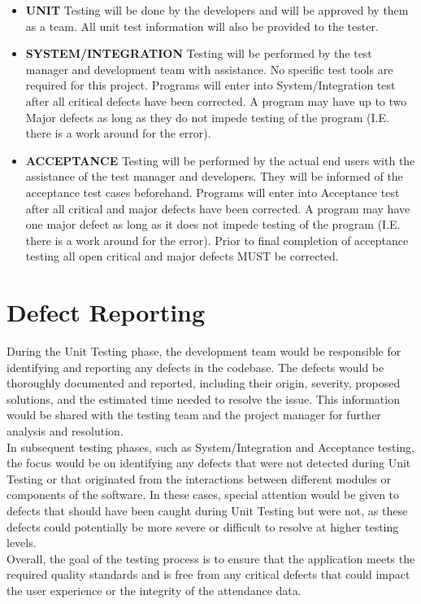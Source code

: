 \documentclass{scrreprt}
\begin{document}
\begin{itemize}
    \item \textbf{UNIT} Testing will be done by the developers and will be approved by them as a team. All unit test information will also be provided to the tester.
    \item \textbf{SYSTEM/INTEGRATION} Testing will be performed by the test manager and development team with assistance. No specific test tools are required for this project. Programs will enter into System/Integration test after all critical defects have been corrected. A program may have up to two Major defects as long as they do not impede testing of the program (I.E. there is a work around for the error).
    \item \textbf{ACCEPTANCE} Testing will be performed by the actual end users with the assistance of the test manager and developers. They will be informed of the acceptance test cases beforehand. Programs will enter into Acceptance test after all critical and major defects have been corrected. A program may have one major defect as long as it does not impede testing of the program (I.E. there is a work around for the error). Prior to final completion of acceptance testing all open critical and major defects MUST be corrected.
\end{itemize}
\section{Defect Reporting}
During the Unit Testing phase, the development team would be responsible for identifying and reporting any defects in the codebase. The defects would be thoroughly documented and reported, including their origin, severity, proposed solutions, and the estimated time needed to resolve the issue. This information would be shared with the testing team and the project manager for further analysis and resolution.\\
In subsequent testing phases, such as System/Integration and Acceptance testing, the focus would be on identifying any defects that were not detected during Unit Testing or that originated from the interactions between different modules or components of the software. In these cases, special attention would be given to defects that should have been caught during Unit Testing but were not, as these defects could potentially be more severe or difficult to resolve at higher testing levels.\\ 
Overall, the goal of the testing process is to ensure that the application meets the required quality standards and is free from any critical defects that could impact the user experience or the integrity of the attendance data.
\end{document}
